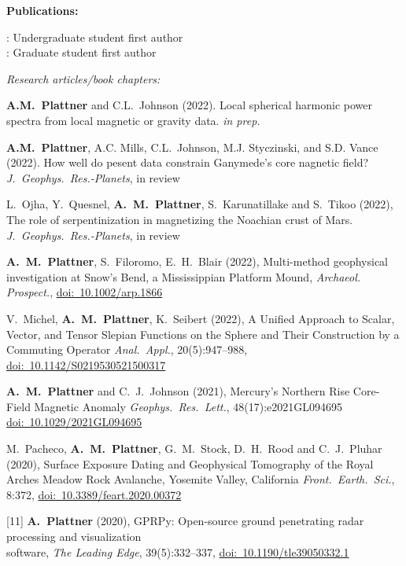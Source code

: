 \documentclass[10pt]{article}
\begin{document}
\spc
\textbf{\tsize Publications:}

\spcp
\ug: Undergraduate student first author\\
\gr: Graduate student first author


\spcp
\emph{Research articles/book chapters:}

\spcp \textbf{A.M.~Plattner} and C.L.~Johnson (2022). Local spherical harmonic power spectra from local magnetic or gravity data. \emph{in prep.}

\spcp \textbf{A.M.~Plattner}, A.C. Mills, C.L.~Johnson, M.J. Styczinski, and
S.D. Vance (2022). How well do pesent data constrain Ganymede's core
nagnetic field? \emph{J.~Geophys.~Res.-Planets}, in review

\spcp
L.~Ojha, Y.~Quesnel, \textbf{A.~M.~Plattner}, S.~Karunatillake and S.~Tikoo (2022),
The role of serpentinization in magnetizing the Noachian crust of Mars.
\emph{J.~Geophys.~Res.-Planets}, in review

\spcp
\shift[15] \textbf{A.~M.~Plattner}, S.~Filoromo, E.~H.~Blair (2022), Multi-method geophysical
investigation at Snow's Bend, a Mississippian Platform Mound,
\emph{Archaeol. Prospect.}, \href{https://doi.org/10.1002/arp.1866}{doi:~10.1002/arp.1866}

\newpage
\shift[14] V.~Michel, \textbf{A.~M.~Plattner}, K.~Seibert (2022),
A Unified Approach to Scalar, Vector, and Tensor Slepian Functions on the Sphere and Their Construction by a Commuting Operator
\emph{Anal.~Appl.}, 20(5):947--988, \href{https://doi.org/10.1142/S0219530521500317}{doi:~10.1142/S0219530521500317}

\spcp
\shift[13] \textbf{A.~M.~Plattner} and C.~J.~Johnson (2021),
Mercury's Northern Rise Core-Field Magnetic Anomaly
\emph{Geophys.~Res.~Lett.}, 48(17):e2021GL094695 \href{https://doi.org/10.1029/2021GL094695}{doi:~10.1029/2021GL094695}

\spcp
\grshift \gr[12] M.~Pacheco, \textbf{A.~M.~Plattner}, G.~M.~Stock, D.~H.~Rood and C.~J.~Pluhar (2020),
Surface Exposure Dating and Geophysical Tomography of the Royal Arches Meadow Rock Avalanche, Yosemite Valley, California
\emph{Front.~Earth.~Sci.}, 8:372, \href{https://www.frontiersin.org/articles/10.3389/feart.2020.00372/full}{doi:~10.3389/feart.2020.00372} 

\spcp
\hspace{-0.675cm}[11] \textbf{A.~Plattner} (2020), GPRPy: Open-source ground penetrating radar processing and visualization \\software, \emph{The Leading Edge}, 39(5):332--337, \href{https://doi.org/10.1190/tle39050332.1}{doi:~10.1190/tle39050332.1}
\end{document}

